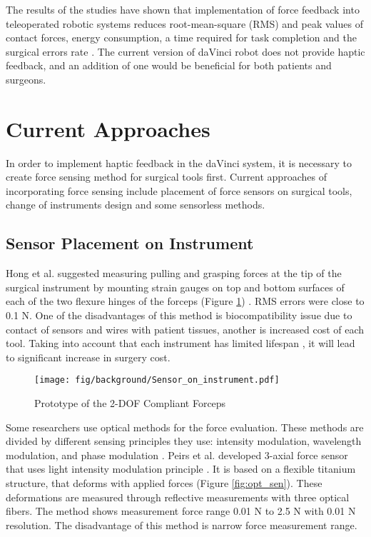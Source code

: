 The results of the studies \cite{wagner_benefit_2007, yiasemidou_faster_2011, currie_role_2017} have shown that implementation of force feedback into teleoperated robotic systems reduces root-mean-square (RMS) and peak values of contact forces, energy consumption, a time required for task completion and the surgical errors rate \cite{tavakoli_haptics_2008}. The current version of daVinci robot does not provide haptic feedback, and an addition of one would be beneficial for both patients and surgeons.

\section{Current Approaches}
\label{sec:CurAppr}

In order to implement haptic feedback in the daVinci system, it is necessary to create force sensing method for surgical tools first. Current approaches of incorporating force sensing include placement of force sensors on surgical tools, change of instruments design and some sensorless methods.

\subsection{Sensor Placement on Instrument}

Hong et al. suggested measuring pulling and grasping forces at the tip of the surgical instrument by mounting strain gauges on top and bottom surfaces of each of the two flexure hinges of the forceps (Figure \ref{fig:integr_sen}) \cite{hong_design_2012}. RMS errors were close to 0.1 N. One of the disadvantages of this method is biocompatibility issue due to contact of sensors and wires with patient tissues, another is increased cost of each tool. Taking into account that each instrument has limited lifespan \cite{ho_health_2011}, it will lead to significant increase in surgery cost.

\begin{figure}[h]
	\begin{center}
	\texttt{[image: fig/background/Sensor\_on\_instrument.pdf]}
	\end{center}
	\vspace{-4mm}
	\caption[Prototype of the 2-DOF Compliant Forceps]
	{Prototype of the 2-DOF Compliant Forceps \cite{hong_design_2012}}
	\label{fig:integr_sen}
	\vspace{-2mm}
\end{figure}

Some researchers use optical methods for the force evaluation. These methods are divided by different sensing principles they use: intensity modulation, wavelength modulation, and phase modulation \cite{su_fiber_optic_2017}. Peirs et al. developed 3-axial force sensor that uses light intensity modulation principle \cite{_micro_2004}. It is based on a flexible titanium structure, that deforms with applied forces (Figure \ref{fig:opt_sen}). These deformations are measured through reflective measurements with three optical fibers. The method shows measurement force range 0.01 N to 2.5 N with 0.01 N resolution. The disadvantage of this method is narrow force measurement range.

